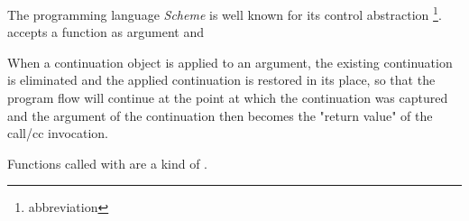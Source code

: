 The programming language \emph{Scheme} is well known for its control abstraction
\callcc\footnote{abbreviation \cc}. \ccc accepts a function as argument and 

When a continuation object is applied to an argument, the existing continuation is eliminated and the applied continuation is restored in its place, so that the program flow will continue at the point at which the continuation was captured and the argument of the continuation then becomes the "return value" of the call/cc invocation. 


Functions called with \invokeop are a kind of \cc.
